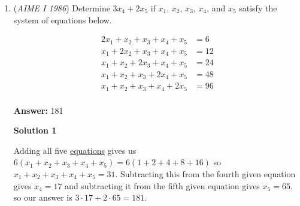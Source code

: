 \begin{enumerate}
 Multiplying by $-a(a-25)$,  we get $a + (-a + 25) = -30a(a-25)$, which is $-30a^2 + 750a = 25$. Dividing everything by 5 and shifting everything to one side gives $6a^2 - 150a + 5 = 0$.

 Using the quadratic formula gives $a = \frac{150 \pm \sqrt {22380}}{12}$. Since this looks too hard to simplify, we can solve for $b$ using $a + b = 25$, which turns out to also be $b = \frac{150 \pm \sqrt {22380}}{12}$, provided that the sign of the radical in $a$ is opposite the one in $b$.

 WLOG, assume $a = \frac{150 + \sqrt{22380}}{12}$ and $b = \frac{150 - \sqrt{22380}}{12}$. Multiplying them gives $ab = \frac{22500 - 22380}{144}$ which simplifies to $\frac{5}{6}$.

 THe denominator of $\frac{25}{1 - ab}$ ends up being $\frac{1}{6}$, so multiplying both numerator and denominator by 6 gives $\boxed{150}$.

 -ThisUsernameIsTaken

 


 Remark: The quadratic need not be solved. The value of $ab$ can be found through Vieta's.

 


	\item (\textit{AIME I 1986}) Determine $3x_4+2x_5$ if $x_1$, $x_2$, $x_3$, $x_4$, and $x_5$ satisfy the system of equations below.

 \begin{align*} 2x_1+x_2+x_3+x_4+x_5&=6 \\ x_1+2x_2+x_3+x_4+x_5&=12 \\ x_1+x_2+2x_3+x_4+x_5&=24 \\ x_1+x_2+x_3+2x_4+x_5&=48 \\ x_1+x_2+x_3+x_4+2x_5&=96 \\ \end{align*}


 \textbf{Answer: }181



\textbf{Solution 1}

Adding all five \href{https://artofproblemsolving.com/wiki/index.php?title=Equation}{equations} gives us $6(x_1 + x_2 + x_3 + x_4 + x_5) = 6(1 + 2 + 4 + 8 + 16)$ so $x_1 + x_2 + x_3 + x_4 + x_5 = 31$.  Subtracting this from the fourth given equation gives $x_4 = 17$ and subtracting it from the fifth given equation gives $x_5 = 65$, so our answer is $3\cdot17 + 2\cdot65 = \boxed{181}$.

 




\end{enumerate}
